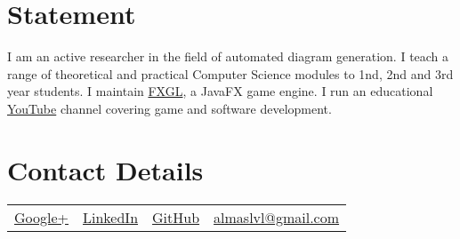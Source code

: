 \documentclass[a4paper,10pt]{article} %
\begin{document}
\section{Statement}

I am an active researcher in the field of automated diagram generation.
I teach a range of theoretical and practical Computer Science modules to 1nd, 2nd and 3rd year students.
I maintain \href{https://github.com/AlmasB/FXGL}{FXGL}, a JavaFX game engine.
I run an educational \href{https://www.youtube.com/almasb0/videos}{YouTube} channel covering
game and software development.


\section{Contact Details}

\begin{tabular}{c | c | c | c}
\href{https://www.google.com/+AlmasB0}{Google+}
& \href{https://www.linkedin.com/in/AlmasB}{LinkedIn}
& \href{https://github.com/AlmasB}{GitHub}
& \href{mailto:almaslvl@gmail.com}{almaslvl@gmail.com} 


\end{tabular}
\end{document}
